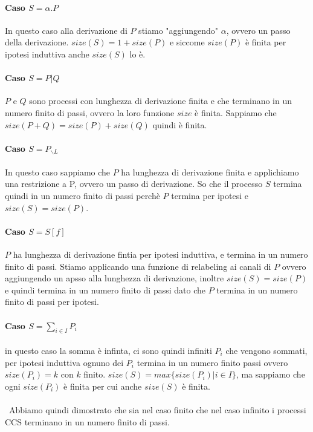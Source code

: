 \documentclass{article}
\newcommand{\pl}{P_{\backslash L}}
\begin{document}
\paragraph{Caso $S=\alpha .P$}
In questo caso alla derivazione di $P$ stiamo "aggiungendo" $\alpha$, ovvero un passo della derivazione.   $size(S)=1+size(P)$ e siccome $size(P)$ è finita per ipotesi induttiva anche $size(S)$ lo è.

\paragraph{Caso $S= P|Q$}
$P$ e $Q$ sono processi con lunghezza di derivazione finita e che terminano in un numero finito di passi, ovvero la loro funzione $size$ è finita. Sappiamo che $size(P+Q)=size(P)+size(Q)$ quindi è finita.

\paragraph{Caso $S=\pl$}
In questo caso sappiamo che $P$ ha lunghezza di derivazione finita e applichiamo una restrizione a P, ovvero un passo di derivazione. So che il processo $S$ termina quindi in un numero finito di passi perchè $P$ termina per ipotesi e $size(S)=size(P)$.

\paragraph{Caso $S=S[f]$}
$P$ ha lunghezza di derivazione fintia per ipotesi induttiva, e termina in un numero finito di passi. Stiamo applicando una funzione di relabeling ai canali di $P$ ovvero aggiungendo un apsso alla lunghezza di derivazione, inoltre $size(S)=size(P)$ e quindi termina in un numero finito di passi dato che $P$ termina in un numero finito di passi per ipotesi.

\paragraph{Caso $S= \sum_{i \in I}P_{i}$}
in questo caso la somma è infinta, ci sono quindi infiniti $P_{i}$ che vengono sommati, per ipotesi induttiva ognuno dei $P_{i}$ termina in un numero finito passi ovvero $size(P_{i})=k$ con $k$ finito. $size(S) = max\{size(P_{i})| i \in I\}$, ma sappiamo che ogni $size(P_{i})$ è finita per cui anche $size(S)$ è finita.\\\\\
Abbiamo quindi dimostrato che sia nel caso finito che nel caso infinito i processi CCS terminano in un numero finito di passi.
\end{document}
